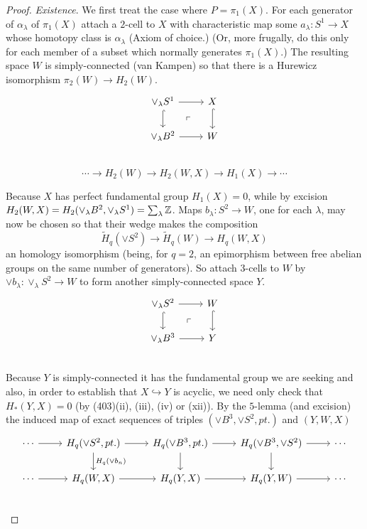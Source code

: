 \begin{proof}
{\em Existence}. We first treat the case where $P = \pi_1(X)$. For each generator of $\alpha_\lambda$ of $\pi_1(X)$ attach a $2$-cell to $X$ with characteristic map some $a_\lambda\colon   S^1 \longrightarrow  X$ whose homotopy class is $\alpha_\lambda$ (Axiom of choice.) (Or, more frugally, do this only for each member of a subset which normally generates $\pi_1(X)$.) The resulting space $W$ is simply-connected (van Kampen) so that there is a Hurewicz isomorphism $\pi_2(W) \longrightarrow  H_2(W)$.
\[
 \begin{tikzcd}
 \vee_\lambda S^1 \arrow[hook]{d} \arrow{r} \arrow[dr, phantom, "\ulcorner"] & 
  X \arrow[hook]{d}\\
 \vee_\lambda B^2 \arrow{r} & W\\
 \end{tikzcd}
 \]
\[\cdots \longrightarrow H_2(W)\longrightarrow H_2(W,X)\longrightarrow H_1(X)\longrightarrow \cdots \]

Because $X$ has perfect fundamental group $H_1(X) = 0$, while by excision $H_2(W,X) = H_2(\vee_\lambda B^2,\vee_\lambda S^1)=\sum_\lambda \mathbb{Z}$. Maps $b_\lambda\colon   S^2\longrightarrow W$, one for each $\lambda$, may now be chosen so that their wedge makes the composition
\[\widetilde{H}_q(\vee S^2) \longrightarrow \widetilde{H}_q(W)\longrightarrow H_q(W,X)\]
an homology isomorphism (being, for $q = 2$, an epimorphism between free abelian groups on the same number of generators). So attach $3$-cells to $W$ by $\vee b_\lambda\colon   \vee_\lambda S^2 \longrightarrow W$ to form another simply-connected space $Y$.
\[
 \begin{tikzcd}
 \vee_\lambda S^2 \arrow[hook]{d} \arrow{r} \arrow[dr, phantom, "\ulcorner"] & 
  W \arrow[hook]{d}\\
 \vee_\lambda B^3 \arrow{r} & Y\\
 \end{tikzcd}
 \]
Because $Y$ is simply-connected it has the fundamental group we are seeking and also, in order to establish that $X\hookrightarrow Y$ is acyclic, we need only check that $H_*(Y, X) = 0$ (by (403)(ii), (iii), (iv) or (xii)). By the $5$-lemma (and excision) the induced map of exact sequences of triples $(\vee B^3, \vee S^2, pt.)$ and $(Y, W, X)$
\[
 \begin{tikzcd}
 \cdots \arrow{r} & H_q(\vee S^2, pt.) \arrow{d}{H_q(\vee b_n)} \arrow{r} & H_q(\vee B^3, pt.) \arrow{d} \arrow{r} &H_q(\vee B^3, \vee S^2) \arrow{d} \arrow{r} &\cdots \\
 \cdots \arrow{r} & H_q(W,X)  \arrow{r} & H_q(Y,X)  \arrow{r} &H_q(Y,W)  \arrow{r} &\cdots \\
 \end{tikzcd}
 \]


\end{proof}
